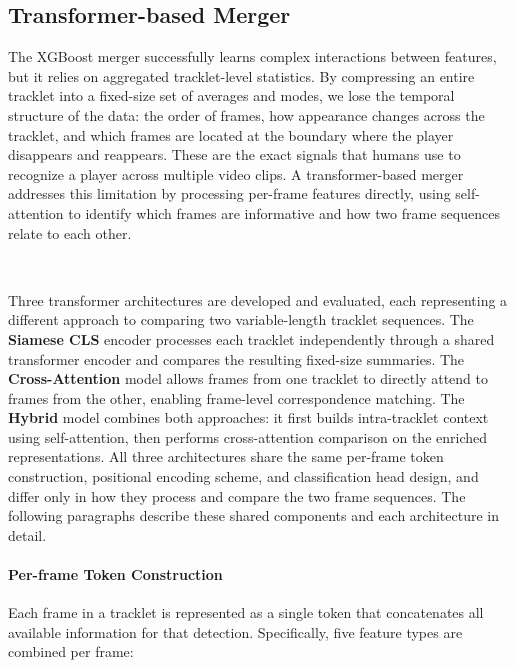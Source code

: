 \subsection{Transformer-based Merger}
The XGBoost merger successfully learns complex interactions between features, but it relies on aggregated tracklet-level statistics. By compressing an entire tracklet into a fixed-size set of averages and modes, we lose the temporal structure of the data: the order of frames, how appearance changes across the tracklet, and which frames are located at the boundary where the player disappears and reappears. These are the exact signals that humans use to recognize a player across multiple video clips. A transformer-based merger addresses this limitation by processing per-frame features directly, using self-attention to identify which frames are informative and how two frame sequences relate to each other.

\

Three transformer architectures are developed and evaluated, each representing a different approach to comparing two variable-length tracklet sequences. The \textbf{Siamese CLS} encoder processes each tracklet independently through a shared transformer encoder and compares the resulting fixed-size summaries. The \textbf{Cross-Attention} model allows frames from one tracklet to directly attend to frames from the other, enabling frame-level correspondence matching. The \textbf{Hybrid} model combines both approaches: it first builds intra-tracklet context using self-attention, then performs cross-attention comparison on the enriched representations. All three architectures share the same per-frame token construction, positional encoding scheme, and classification head design, and differ only in how they process and compare the two frame sequences. The following paragraphs describe these shared components and each architecture in detail.


\paragraph{Per-frame Token Construction}\label{par:token_construction}
Each frame in a tracklet is represented as a single token that concatenates all available information for that detection. Specifically, five feature types are combined per frame:

